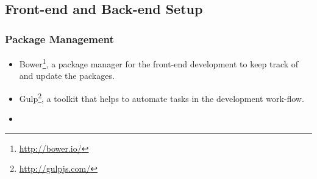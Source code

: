 \subsection{Front-end and Back-end Setup}

\subsubsection{Package Management}

\begin{itemize}

\item Bower\footnote{\url{http://bower.io/}}, a package manager for the front-end development to keep track of and update the packages. 

\item Gulp\footnote{\url{http://gulpjs.com/}}, a toolkit that helps to automate tasks in the development work-flow. 

\item 

\end{itemize}